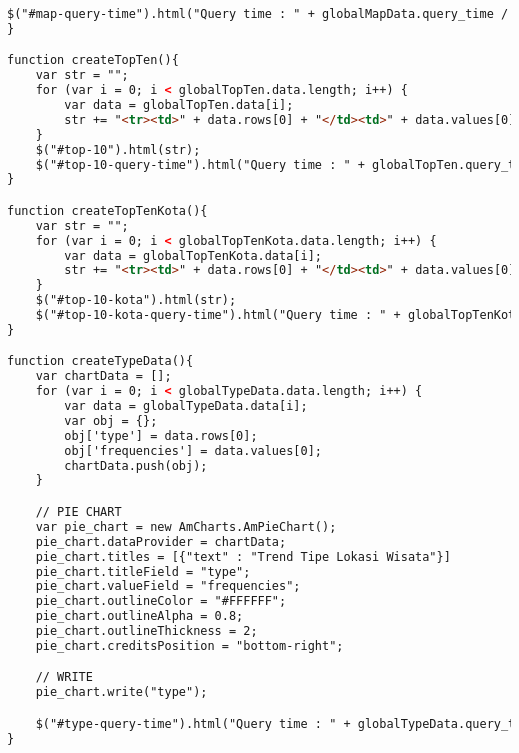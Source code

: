 \begin{lstlisting}[language=HTML,basicstyle=\tiny,caption=script-dashboard.js]
    $("#map-query-time").html("Query time : " + globalMapData.query_time / 1000 + "s");
}

function createTopTen(){
    var str = "";
    for (var i = 0; i < globalTopTen.data.length; i++) {
        var data = globalTopTen.data[i];
        str += "<tr><td>" + data.rows[0] + "</td><td>" + data.values[0] + "</td></tr>";
    }
    $("#top-10").html(str);
    $("#top-10-query-time").html("Query time : " + globalTopTen.query_time / 1000 + "s");
}

function createTopTenKota(){
    var str = "";
    for (var i = 0; i < globalTopTenKota.data.length; i++) {
        var data = globalTopTenKota.data[i];
        str += "<tr><td>" + data.rows[0] + "</td><td>" + data.values[0] + "</td></tr>";
    }
    $("#top-10-kota").html(str);
    $("#top-10-kota-query-time").html("Query time : " + globalTopTenKota.query_time / 1000 + "s");
}

function createTypeData(){
    var chartData = [];
    for (var i = 0; i < globalTypeData.data.length; i++) {
        var data = globalTypeData.data[i];
        var obj = {};
        obj['type'] = data.rows[0];
        obj['frequencies'] = data.values[0];
        chartData.push(obj);
    }

    // PIE CHART
    var pie_chart = new AmCharts.AmPieChart();
    pie_chart.dataProvider = chartData;
    pie_chart.titles = [{"text" : "Trend Tipe Lokasi Wisata"}]
    pie_chart.titleField = "type";
    pie_chart.valueField = "frequencies";
    pie_chart.outlineColor = "#FFFFFF";
    pie_chart.outlineAlpha = 0.8;
    pie_chart.outlineThickness = 2;
    pie_chart.creditsPosition = "bottom-right";

    // WRITE
    pie_chart.write("type");

    $("#type-query-time").html("Query time : " + globalTypeData.query_time / 1000 + "s");
}
\end{lstlisting}

